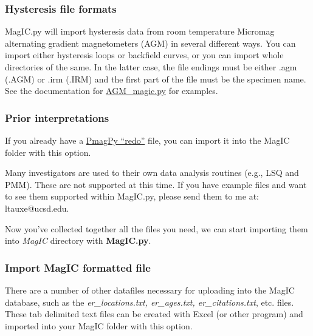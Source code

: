 \documentclass[11pt]{book}
\begin{document}
{
\subsubsection{Hysteresis file formats}
MagIC.py will import hysteresis data from room temperature  Micromag alternating gradient magnetometers (AGM)  in several different ways.  You can import either hysteresis loops or backfield curves, or you can import whole directories of the same.  In the latter case, the file endings must be either .agm (.AGM) or .irm (.IRM) and the first part of the file must be the specimen name.   
 See the documentation for  \href{#AGM\_magic.py}{AGM\_magic.py} for examples.  



\subsubsection{Prior interpretations}  

If you already have a  \href{#mk_redo.py}{PmagPy ``redo''} file, you can import it into the MagIC folder with this option.  

Many investigators are used to their own data analysis routines (e.g., LSQ and PMM).  These are not supported at this time.  If you have example files and want to see them supported within MagIC.py, please send them to me at:  ltauxe@ucsd.edu.

Now you've collected together all the files you need, we can start importing them into {\it MagIC} directory with {\bf MagIC.py}.   

\subsubsection{Import MagIC formatted file}  

There are a number of other datafiles necessary for uploading into the MagIC database, such as the {\it er\_locations.txt, er\_ages.txt, er\_citations.txt}, etc. files.  These tab delimited text files can be created with Excel (or other program) and imported into your MagIC folder with this option.   

}
\end{document}
